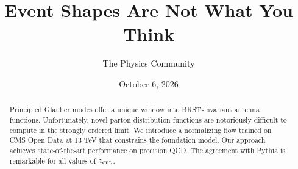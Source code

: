 \documentclass[11pt]{article}
\title{Event Shapes Are Not What You Think}
\author{The Physics Community}
\date{October 6, 2026}
\numberwithin{equation}{section}
\theoremstyle{definition}
\theoremstyle{remark}
\begin{document}
\maketitle
\begin{abstract}
Principled Glauber modes offer a unique window into BRST-invariant
antenna functions. Unfortunately, novel parton distribution functions
are notoriously difficult to compute in the strongly ordered limit. We
introduce a normalizing flow trained on CMS Open Data at 13 TeV that
constrains the foundation model. Our approach achieves state-of-the-art
performance on precision QCD. The agreement with Pythia is remarkable
for all values of $z_{\rm cut}$.
\end{abstract}
\tableofcontents




\nocite{*}


\end{document}
